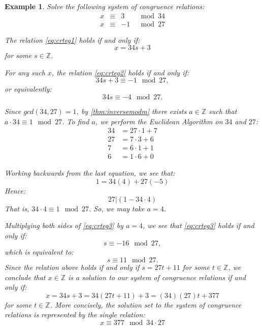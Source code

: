\documentclass[a4paper,12pt]{report}
\newcounter{statement}
\numberwithin{statement}{chapter}
\newtheorem{eg}[statement]{\bf Example}
\numberwithin{equation}{chapter}
\numberwithin{section}{chapter}
\numberwithin{subsection}{section}
\begin{document}
\begin{eg}
Solve the following system of congruence relations:
\begin{align}
x &\equiv&  3  & \mod 34 \label{eq:crteg1}\\
x &\equiv&  -1 & \mod 27 \label{eq:crteg2}
\end{align}

The relation \eqref{eq:crteg1} holds if and only if:
\[
x = 34s + 3
\]
for some $s \in \mathbb{Z}$.




For any such $x$, the relation \eqref{eq:crteg2} holds if and only if:
\[
34s + 3 \equiv -1 \mod 27,
\]
or equivalently:
\begin{equation}
\label{eq:crteg3}
34s \equiv -4 \mod 27.
\end{equation}

Since $gcd(34, 27) = 1$, by \cref{thm:inversemodm} there exists $a \in \mathbb{Z}$ such that $a\cdot 34 \equiv 1 \mod 27$.
To find $a$, we perform the Euclidean Algorithm on $34$ and $27$:
\[
\begin{split}
34 &= 27 \cdot 1 + 7\\
27 &= 7 \cdot 3 + 6\\
7 &= 6 \cdot 1 + 1\\
6 &= 1\cdot 6 + 0
\end{split}
\]

Working backwards from the last equation, we see that:
\[
1 = 34(4) + 27(-5)
\]
Hence:
\[
27 | (1 - 34\cdot 4 )
\]
That is, $34 \cdot 4 \equiv 1 \mod 27$.
So, we may take $a = 4$.




Multiplying both sides of \eqref{eq:crteg3} by $a = 4$, we see that \eqref{eq:crteg3} holds if and only if:
\[
s \equiv -16 \mod 27,
\]
which is equivalent to:
\[
s \equiv 11 \mod 27.
\]
Since the relation above holds if and only if $s = 27t + 11$
for some $t \in \mathbb{Z}$,
we conclude that $x \in \mathbb{Z}$ is a solution to our system of congruence relations if and only if:
\[
x = 34s + 3 = 34(27t + 11) + 3 = (34)(27)t + 377
\]
for some $t \in \mathbb{Z}$.
More concisely, the solution set to the system of congruence relations is represented by the single relation:
\[
x \equiv 377 \mod 34\cdot 27
\]
\end{eg}
\end{document}
